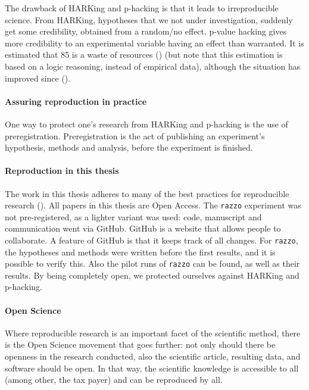 The drawback of HARKing and p-hacking is that it leads to
irreproducible science. From HARKing, hypotheses that we not under
investigation, suddenly get some credibility, obtained from a
random/no effect. p-value hacking gives more credibility 
to an experimental variable having an effect than warranted.
It is estimated that 85%
is a waste of resources (\cite{chalmers2009avoidable}) (but note
that this estimation is based on a logic reasoning, instead
of empirical data), although the situation has improved 
since (\cite{macleod2014biomedical}). 

\paragraph{Assuring reproduction in practice}

One way to protect one's research from HARKing and p-hacking
is the use of preregistration. Preregistration is the act of
publishing an experiment's hypothesis, methods and analysis,
before the experiment is finished. 

\paragraph{Reproduction in this thesis}

The work in this thesis adheres to many of the best 
practices for reproducible research (\cite{munafo2017manifesto}).
All papers in this thesis are Open Access.
The \verb;razzo; experiment was not pre-registered, as a lighter variant was used:
code, manuscript and communication went via GitHub. GitHub is a website that
allows people to collaborate. A feature of GitHub is that it keeps track
of all changes. For \verb;razzo;, the hypotheses and methods were written
before the first results, and it is possible to verify this.
Also the pilot runs of \verb;razzo; can be found, as well as their results.
By being completely open, we protected ourselves against HARKing and
p-hacking.

\paragraph{Open Science}

Where reproducible research is an important facet of the scientific method,
there is the Open Science movement that goes further: not only
should there be openness in the research conducted,
also the scientific article, resulting data, and software should be open.
In that way, the scientific knowledge is accessible to all (among other,
the tax payer) and can be reproduced by all. 


